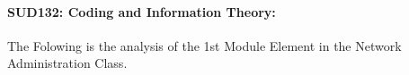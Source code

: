 \documentclass[12pt]{extreport}
\begin{document}
\begin{comment}
\subparagraph{Interpretation of the Box-plots:}
For This Element 

\begin{enumerate}	
	\item The MP Class Box-Plot:
	\begin{enumerate}
		\item MAX = a {} {} {} {} {} {} {} {} UQ = b {} {} {} {} {} {} {} {} Median = c
		\item LQ = d {} {} {} {} {} {} {} {}  MIN =	l {} {} {} {} {} {} {} {}  IQR = e - f = g
	\end{enumerate}
	\item The PSI Class Box-Plot:
	\begin{enumerate}
		\item MAX = a {} {} {} {} {} {} {} {} UQ = b {} {} {} {} {} {} {} {} Median = c
		\item LQ = d {} {} {} {} {} {} {} {}  MIN =	e {} {} {} {} {} {} {} {} IQR = f - g = h	
	\end{enumerate}
	\item The TSI Class Box-Plot:
	\begin{enumerate}
		\item MAX = a {} {} {} {} {} {} {} {} UQ = b {} {} {} {} {} {} {} {} Median = c
		\item LQ = d {} {} {} {} {} {} {} {} MIN = e {} {} {} {} {} {} {} {} IQR = f - g = h	
	\end{enumerate}
\end{enumerate}

\subparagraph{Interpretation of the histogram:}
This Frequency Distribution is (Skeness) with the following descriptive statistics:
\begin{enumerate}
	\item Mean = 
	\item STD = 
	\item Range = a - b = c
	\item IQR = a-b = c 
\end{enumerate}
\end{comment}




\paragraph{\large SUD132: Coding and Information Theory:\\
}
The Folowing is the analysis of the 1st Module Element in the Network Administration Class. 
\end{document}
